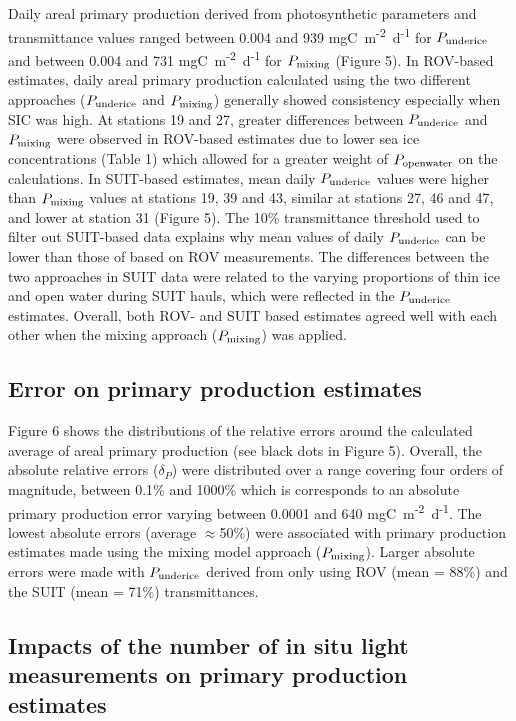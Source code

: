 \documentclass[draft]{agujournal2018}
\newcommand{\ppopenwater}{\ensuremath{P_{\textnormal{\scriptsize openwater}}}}
\newcommand{\ppmixing}{\ensuremath{P_{\textnormal{\scriptsize mixing}}}}
\newcommand{\ppunderice}{\ensuremath{P_{\textnormal{\scriptsize underice}}}}
\newcommand{\dailypp}{mgC~m\textsuperscript{-2}~d\textsuperscript{-1}}
\begin{document}
Daily areal primary production derived from photosynthetic parameters and transmittance values ranged between 0.004 and 939 \dailypp{} for \ppunderice{} and between 0.004 and 731 \dailypp{} for \ppmixing{} (Figure 5). In ROV-based estimates, daily areal primary production calculated using the two different approaches (\ppunderice{} and \ppmixing{}) generally showed consistency especially when SIC was high. At stations 19 and 27, greater differences between \ppunderice{} and \ppmixing{} were observed in ROV-based estimates due to lower sea ice concentrations (Table 1) which allowed for a greater weight of \ppopenwater{} on the calculations. In SUIT-based estimates, mean daily \ppunderice{} values were higher than \ppmixing{} values at stations 19, 39 and 43, similar at stations 27, 46 and 47, and lower at station 31 (Figure 5). The 10\% transmittance threshold used to filter out SUIT-based data explains why mean values of daily \ppunderice{} can be lower than those of based on ROV measurements. The differences between the two approaches in SUIT data were related to the varying proportions of thin ice and open water during SUIT hauls, which were reflected in the \ppunderice{} estimates. Overall, both ROV- and SUIT based estimates agreed well with each other when the mixing approach (\ppmixing{}) was applied.

\subsection{Error on primary production estimates}

Figure 6 shows the distributions of the relative errors around the calculated average of areal primary production (see black dots in Figure 5). Overall, the absolute relative errors ($\delta_P$) were distributed over a range covering four orders of magnitude, between 0.1\% and 1000\% which is corresponds to an absolute primary production error varying between 0.0001 and 640 \dailypp{}. The lowest absolute errors (average $\approx$50\%) were associated with primary production estimates made using the mixing model approach (\ppmixing{}). Larger absolute errors were made with \ppunderice{} derived from only using ROV (mean = 88\%) and the SUIT (mean = 71\%) transmittances.

\subsection{Impacts of the number of in situ light measurements on primary production estimates}
\end{document}
